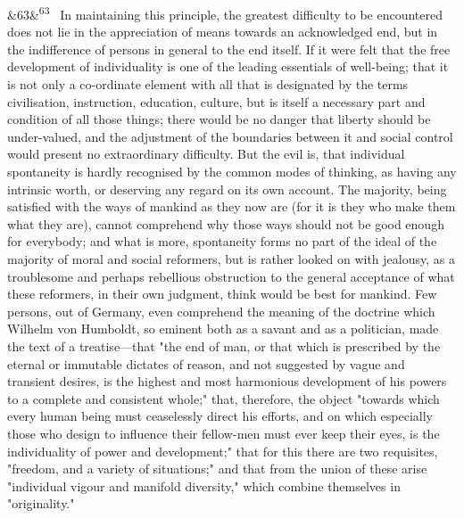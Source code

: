 \documentclass[12pt]{article}
\newcommand{\para}[1][]{\par\noindent\ifx&#1&\else\textsuperscript{\footnotesize #1}~\fi}
\begin{document}
\para[63] In maintaining this principle, the greatest difficulty to be encountered does not lie in the appreciation of means towards an acknowledged end, but in the indifference of persons in general to the end itself. If it were felt that the free development of individuality is one of the leading essentials of well-being; that it is not only a co-ordinate element with all that is designated by the terms civilisation, instruction, education, culture, but is itself a necessary part and condition of all those things; there would be no danger that liberty should be under-valued, and the adjustment of the boundaries between it and social control would present no extraordinary difficulty. But the evil is, that individual spontaneity is hardly recognised by the common modes of thinking, as having any intrinsic worth, or deserving any regard on its own account. The majority, being satisfied with the ways of mankind as they now are (for it is they who make them what they are), cannot comprehend why those ways should not be good enough for everybody; and what is more, spontaneity forms no part of the ideal of the majority of moral and social reformers, but is rather looked on with jealousy, as a troublesome and perhaps rebellious obstruction to the general acceptance of what these reformers, in their own judgment, think would be best for mankind. Few persons, out of Germany, even comprehend the meaning of the doctrine which Wilhelm von Humboldt, so eminent both as a savant and as a politician, made the text of a treatise---that "the end of man, or that which is prescribed by the eternal or immutable dictates of reason, and not suggested by vague and transient desires, is the highest and most harmonious development of his powers to a complete and consistent whole;" that, therefore, the object "towards which every human being must ceaselessly direct his efforts, and on which especially those who design to influence their fellow-men must ever keep their eyes, is the individuality of power and development;" that for this there are two requisites, "freedom, and a variety of situations;" and that from the union of these arise "individual vigour and manifold diversity," which combine themselves in "originality."
\end{document}
